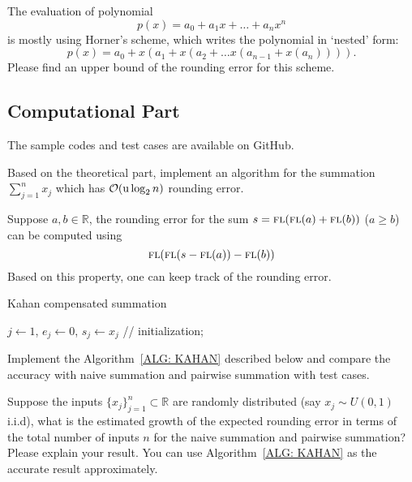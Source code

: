 \begin{problem}
\label{Prb: 1-Theo-3}
The evaluation of polynomial 
    $$p(x) = a_0 + a_1 x + \dots + a_n x^n$$
is mostly using Horner's scheme, which writes the polynomial in `nested' form:
\begin{equation}
p(x) = a_0 + x (a_1 + x(a_2 + \dots x(a_{n-1} + x(a_n)))).
\end{equation}                                
Please find an upper bound of the rounding error for this scheme.         
\end{problem}

\subsection{Computational Part}
The sample codes and test cases are available on GitHub. 
\begin{problem}
    Based on the theoretical part, implement an algorithm for the summation $\sum_{j=1}^n x_j$ which has $\mathcal O(\textup{u}\log_2 n)$ rounding error.
\end{problem}

\begin{problem} 
\label{Prb: 1-Kahan-Sum}
Suppose $a, b\in\mathbb{R}$, the rounding error for the sum $s = {\textsc{fl}}({\textsc{fl}}(a)+{\textsc{fl}}(b))$ ($a\ge b$) can be computed using 
    $${\textsc{fl}}({\textsc{fl}}(s - {\textsc{fl}}(a))-{\textsc{fl}}(b))$$
    Based on this property, one can keep track of the rounding error. 
\begin{algorithm}[!htb]
    \SetAlgoLined
    \caption{Kahan compensated summation}
    $j\gets 1$, $e_j \gets 0$, $s_j \gets x_j$ //    initialization; 
    \\
    \label{ALG: KAHAN}
\end{algorithm}
    Implement the Algorithm~\ref{ALG: KAHAN} described below and compare the accuracy with naive summation and pairwise summation with test cases.
\end{problem}


\begin{problem}
    Suppose the inputs $\{x_j\}_{j=1}^n\subset \mathbb{R}$ are randomly distributed (say $x_j\sim U(0,1)$ i.i.d), what is the estimated growth of the expected rounding error in terms of the total number of inputs $n$ for the naive summation and pairwise summation? Please explain your result. You can use Algorithm~\ref{ALG: KAHAN} as the accurate result approximately. 
\end{problem}
\newpage
\nocite{higham1993accuracy,higham2019new,muller2006elementary}


